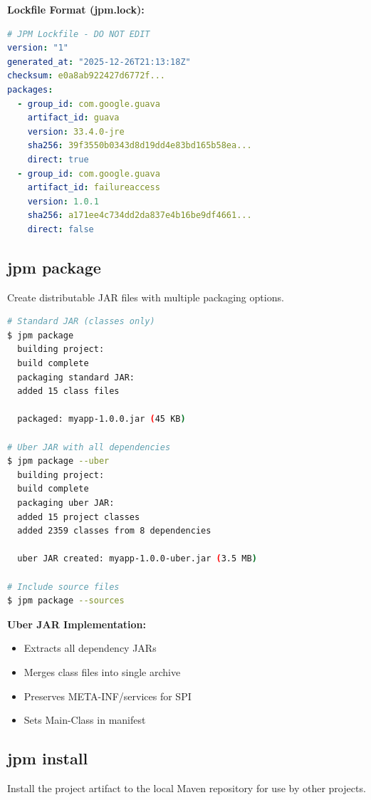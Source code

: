 \documentclass[12pt,a4paper]{report}
\begin{document}
\textbf{Lockfile Format (jpm.lock):}
\begin{lstlisting}[language=yaml, caption=Lockfile Structure]
# JPM Lockfile - DO NOT EDIT
version: "1"
generated_at: "2025-12-26T21:13:18Z"
checksum: e0a8ab922427d6772f...
packages:
  - group_id: com.google.guava
    artifact_id: guava
    version: 33.4.0-jre
    sha256: 39f3550b0343d8d19dd4e83bd165b58ea...
    direct: true
  - group_id: com.google.guava
    artifact_id: failureaccess
    version: 1.0.1
    sha256: a171ee4c734dd2da837e4b16be9df4661...
    direct: false
\end{lstlisting}

\subsection{jpm package}

Create distributable JAR files with multiple packaging options.

\begin{lstlisting}[language=bash, caption=Project Packaging]
# Standard JAR (classes only)
$ jpm package
  building project:
  build complete
  packaging standard JAR:
  added 15 class files
  
  packaged: myapp-1.0.0.jar (45 KB)

# Uber JAR with all dependencies
$ jpm package --uber
  building project:
  build complete
  packaging uber JAR:
  added 15 project classes
  added 2359 classes from 8 dependencies
  
  uber JAR created: myapp-1.0.0-uber.jar (3.5 MB)

# Include source files
$ jpm package --sources
\end{lstlisting}

\textbf{Uber JAR Implementation:}
\begin{itemize}
    \item Extracts all dependency JARs
    \item Merges class files into single archive
    \item Preserves META-INF/services for SPI
    \item Sets Main-Class in manifest
\end{itemize}

\subsection{jpm install}

Install the project artifact to the local Maven repository for use by other projects.
\end{document}
